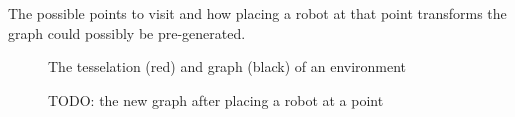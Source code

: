 The possible points to visit and how placing a robot at that point transforms the graph could possibly be pre-generated.

\begin{figure}[h!t]
	\caption{The tesselation (red) and graph (black) of an environment}
	\label{searchDestroy}
\end{figure}

\begin{figure}[h!t]
	\caption{TODO: the new graph after placing a robot at a point}
	\label{searchDestroy2}
\end{figure}
